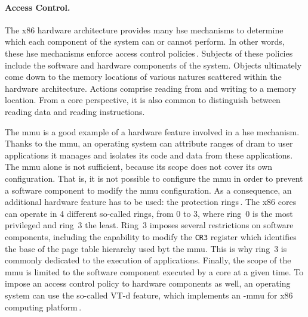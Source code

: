 
\paragraph{Access Control.}
%
The x86 hardware architecture provides many \ac{hse} mechanisms  to determine
which \IO each component of the system can or cannot perform.
%
In other words, these \ac{hse} mechanisms enforce access control
policies\,\cite{sandhu1994access}.
%
Subjects of these policies include the software and hardware components of the
system.
%
Objects ultimately come down to the memory locations of various natures
scattered within the hardware architecture.
%
Actions comprise reading from and writing to a memory location. From a core
perspective, it is also common to distinguish between reading data and reading
instructions.

The \ac{mmu} is a good example of a hardware feature involved in a \ac{hse}
mechanism.
%
Thanks to the \ac{mmu}, an operating system can attribute ranges of \ac{dram} to
user applications it manages and isolates its code and data from these
applications.
%
The \ac{mmu} alone is not sufficient, because its scope does not cover its own
configuration.
%
That is, it is not possible to configure the \ac{mmu} in order to prevent a
software component to modify the \ac{mmu} configuration.
%
As a consequence, an additional hardware feature has to be used: the protection
rings\,\cite[Volume 3, Section 5.5]{intel2014manual}.
%
The x86 cores can operate in 4 different so-called rings, from 0 to 3, where
ring~0 is the most privileged and ring~3 the least.
%
Ring~3 imposes several restrictions on software components, including the
capability to modify the \texttt{CR3} register which identifies the base of the
page table hierarchy used byt the \ac{mmu}.
%
This is why ring~3 is commonly dedicated to the execution of applications.
%
Finally, the scope of the \ac{mmu} is limited to the software component executed
by a core at a given time.
%
To impose an access control policy to hardware components as well, an operating
system can use the so-called VT-d feature, which implements an \IO-\ac{mmu} for
x86 computing platform\,\cite{abramson2006vtd}.

